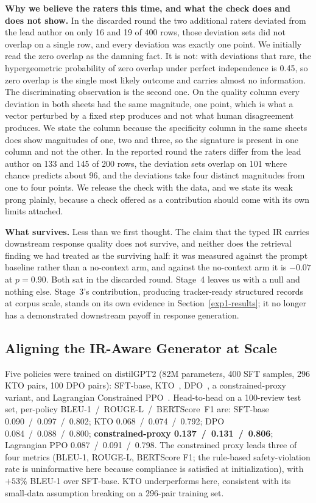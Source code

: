 \documentclass[preprint,12pt]{elsarticle}
\begin{document}
\textbf{Why we believe the raters this time, and what the check does and does not show.} In the
discarded round the two additional raters deviated from the lead author on only 16 and 19 of 400
rows, those deviation sets did not overlap on a single row, and every deviation was exactly one
point. We initially read the zero overlap as the damning fact. It is not: with deviations that
rare, the hypergeometric probability of zero overlap under perfect independence is 0.45, so zero
overlap is the single most likely outcome and carries almost no information. The discriminating
observation is the second one. On the quality column every deviation in both sheets had the same magnitude, one point, which is
what a vector perturbed by a fixed step produces and not what human disagreement produces. We
state the column because the specificity column in the same sheets does show magnitudes of one,
two and three, so the signature is present in one column and not the other. In the
reported round the raters differ from the lead author on 133 and 145 of 200 rows, the deviation
sets overlap on 101 where chance predicts about 96, and the deviations take four distinct
magnitudes from one to four points. We release the check with the data, and we state its weak
prong plainly, because a check offered as a contribution should come with its own limits
attached.

\textbf{What survives.} Less than we first thought. The claim that the typed IR carries
downstream response quality does not survive, and neither does the retrieval finding we had
treated as the surviving half: it was measured against the prompt baseline rather than a
no-context arm, and against the no-context arm it is $-0.07$ at $p = 0.90$. Both sat in the
discarded round. Stage~4 leaves us with a null and nothing else. Stage~3's contribution, producing tracker-ready structured records at corpus scale,
stands on its own evidence in Section~\ref{exp1-results}; it no longer has a demonstrated
downstream payoff in response generation.

\subsection{Aligning the IR-Aware Generator at Scale}\label{exp3-results}

  Five policies were trained on distilGPT2 (82M parameters, 400 SFT samples, 296 KTO pairs, 100
  DPO pairs): SFT-base, KTO~\cite{ethayarajh2024kto}, DPO~\cite{rafailov2023direct}, a constrained-proxy
  variant, and Lagrangian Constrained PPO~\cite{schulman2017proximal, dai2024safe}. Head-to-head on a
  100-review test set, per-policy BLEU-1~/~ROUGE-L~/~BERTScore~F1 are: SFT-base
  0.090~/~0.097~/~0.802; KTO 0.068~/~0.074~/~0.792; DPO 0.084~/~0.088~/~0.800;
  \textbf{constrained-proxy 0.137~/~0.131~/~0.806}; Lagrangian PPO 0.087~/~0.091~/~0.798. The
  constrained proxy leads three of four metrics (BLEU-1, ROUGE-L, BERTScore F1; the rule-based
  safety-violation rate is uninformative here because compliance is satisfied at
  initialization), with $+53\%$ BLEU-1 over SFT-base. KTO underperforms here, consistent with
  its small-data assumption breaking on a 296-pair training set.
\end{document}
